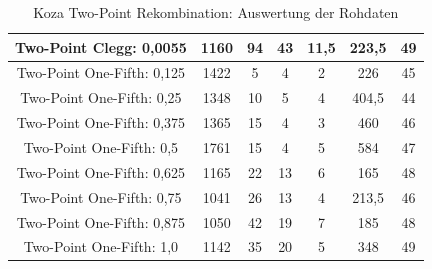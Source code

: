 \begin{table}[H]
\begin{tabular}{c | c | c | c | c | c | c}
		\hline
		Two-Point Clegg: 0,0055 & 1160 & 94 & 43 & 11,5 & 223,5 & 49\\
		\hline
		Two-Point One-Fifth: 0,125 & 1422 & 5 & 4 & 2 & 226 & 45\\
		\hline
		Two-Point One-Fifth: 0,25 & 1348 & 10 & 5 & 4 & 404,5 & 44\\
		\hline
		Two-Point One-Fifth: 0,375 & 1365 & 15 & 4 & 3 & 460 & 46\\
		\hline
		Two-Point One-Fifth: 0,5 & 1761 & 15 & 4 & 5 & 584 & 47\\
		\hline
		Two-Point One-Fifth: 0,625 & 1165 & 22 & 13 & 6 & 165 & 48\\
		\hline
		Two-Point One-Fifth: 0,75 & 1041 & 26 & 13 & 4 & 213,5 & 46\\
		\hline
		Two-Point One-Fifth: 0,875 & 1050 & 42 & 19 & 7 & 185 & 48\\
		\hline
		Two-Point One-Fifth: 1,0 & 1142 & 35 & 20 & 5 & 348 & 49\\
	\end{tabular}
	\caption{Koza Two-Point Rekombination: Auswertung der Rohdaten}
	\label{table:kozaTwoPointRohdaten}
\end{table}





